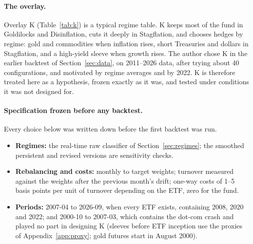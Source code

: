 \documentclass[11pt,a4paper]{article}
\begin{document}
\paragraph{The overlay.} Overlay K (Table~\ref{tab:k}) is a typical regime table. K keeps most of the fund in
Goldilocks and Disinflation, cuts it deeply in Stagflation, and chooses hedges by regime: gold and
commodities when inflation rises, short Treasuries and dollars in Stagflation, and a high-yield sleeve when growth rises. The author chose K in the earlier backtest of Section~\ref{sec:data}, on 2011--2026
data, after trying about 40 configurations, and motivated by regime averages and by 2022. K is therefore treated here as a hypothesis, frozen exactly as it was, and tested under conditions it was not
designed for.

\paragraph{Specification frozen before any backtest.} Every choice below was written down before the first
backtest was run.
\begin{itemize}
\item \textbf{Regimes:} the real-time raw classifier of Section~\ref{sec:regimes}; the smoothed persistent and
revised versions are sensitivity checks.
\item \textbf{Rebalancing and costs:} monthly to target weights; turnover measured against the weights after the
previous month's drift; one-way costs of 1--5 basis points per unit of turnover depending on the ETF, zero for
the fund.
\item \textbf{Periods:} 2007-04 to 2026-09, when every ETF exists, containing 2008, 2020 and 2022; and 2000-10 to
2007-03, which contains the dot-com crash and played no part in designing K (sleeves before ETF inception use
the proxies of Appendix~\ref{app:proxy}; gold futures start in August 2000).
\end{itemize}
\end{document}
